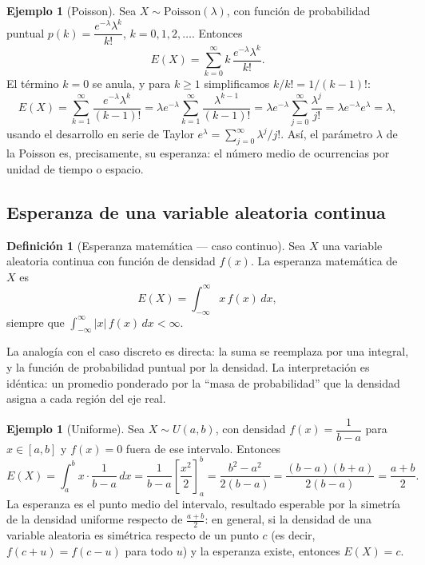 \documentclass[11pt,a4paper]{article}
\theoremstyle{plain}
\theoremstyle{definition}
\newtheorem{definicion}[teorema]{Definición}
\newtheorem{ejemplo}[teorema]{Ejemplo}
\theoremstyle{remark}
\begin{document}
\begin{ejemplo}[Poisson]
Sea $X\sim\text{Poisson}(\lambda)$, con función de probabilidad puntual $p(k)=\dfrac{e^{-\lambda}\lambda^k}{k!}$, $k=0,1,2,\dots$. Entonces
\[
E(X) = \sum_{k=0}^{\infty} k\,\frac{e^{-\lambda}\lambda^k}{k!}.
\]
El término $k=0$ se anula, y para $k\geq1$ simplificamos $k/k! = 1/(k-1)!$:
\[
E(X) = \sum_{k=1}^{\infty} \frac{e^{-\lambda}\lambda^k}{(k-1)!} = \lambda e^{-\lambda}\sum_{k=1}^\infty \frac{\lambda^{k-1}}{(k-1)!} = \lambda e^{-\lambda}\sum_{j=0}^\infty \frac{\lambda^j}{j!} = \lambda e^{-\lambda} e^{\lambda} = \lambda,
\]
usando el desarrollo en serie de Taylor $e^{\lambda}=\sum_{j=0}^\infty \lambda^j/j!$. Así, el parámetro $\lambda$ de la Poisson es, precisamente, su esperanza: el número medio de ocurrencias por unidad de tiempo o espacio.
\end{ejemplo}

\subsection{Esperanza de una variable aleatoria continua}

\begin{definicion}[Esperanza matemática --- caso continuo]
Sea $X$ una variable aleatoria continua con función de densidad $f(x)$. La esperanza matemática de $X$ es
\[
E(X) = \int_{-\infty}^{\infty} x\,f(x)\,dx,
\]
siempre que $\displaystyle\int_{-\infty}^{\infty}|x|\,f(x)\,dx < \infty$.
\end{definicion}

La analogía con el caso discreto es directa: la suma se reemplaza por una integral, y la función de probabilidad puntual por la densidad. La interpretación es idéntica: un promedio ponderado por la ``masa de probabilidad'' que la densidad asigna a cada región del eje real.

\begin{ejemplo}[Uniforme]
Sea $X\sim U(a,b)$, con densidad $f(x)=\dfrac{1}{b-a}$ para $x\in[a,b]$ y $f(x)=0$ fuera de ese intervalo. Entonces
\[
E(X) = \int_a^b x\cdot\frac{1}{b-a}\,dx = \frac{1}{b-a}\left[\frac{x^2}{2}\right]_a^b = \frac{b^2-a^2}{2(b-a)} = \frac{(b-a)(b+a)}{2(b-a)} = \frac{a+b}{2}.
\]
La esperanza es el punto medio del intervalo, resultado esperable por la simetría de la densidad uniforme respecto de $\frac{a+b}{2}$: en general, si la densidad de una variable aleatoria es simétrica respecto de un punto $c$ (es decir, $f(c+u)=f(c-u)$ para todo $u$) y la esperanza existe, entonces $E(X)=c$.
\end{ejemplo}
\end{document}

